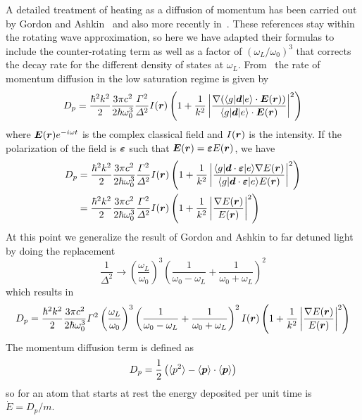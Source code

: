 A detailed treatment of heating as a diffusion of momentum has been carried
out by Gordon and Ashkin~\cite{Gordon1980} and also more recently
in~\cite{Gerbier2010, Pichler2010,Riou2012}.   These references stay within
the rotating wave approximation,  so here we have adapted their formulas to
include the counter-rotating term as well as a factor of
$(\omega_{L}/\omega_{0})^{3}$ that corrects the decay rate for the different
density of states at $\omega_{L}$.  From~\cite{Gordon1980} the rate of
momentum diffusion in the low saturation regime is given by
\begin{equation}
  D_{p} = \frac{\hbar^2 k^{2}}{2}  
   \frac{3\pi c^{2}}{2\hbar\omega_{0}^{3} }  
   \frac{\Gamma^{2}}{\Delta^{2}} I(\bm{r}) 
  \left( 1 + \frac{1}{k^{2}}
    \left| \frac{\nabla( \langle g|\bm{d}|e\rangle\cdot \bm{E}(\bm{r})  )}
                { \langle g|\bm{d}|e\rangle \cdot \bm{E}(\bm{r})} 
    \right|^{2} \right) 
\end{equation}
where $\bm{E}(\bm{r})e^{-i\omega t}$ is the complex classical field and
$I(\bm{r})$ is the intensity.  If the polarization of the field is
$\bm{\varepsilon}$ such that $\bm{E}(\bm{r}) = \bm{\varepsilon} E(\bm{r})$, we
have  
\begin{equation}
\begin{split}
  D_{p} & = 
  \frac{\hbar^2 k^{2}}{2}  
   \frac{3\pi c^{2}}{2\hbar\omega_{0}^{3} }  
   \frac{\Gamma^{2}}{\Delta^{2}} I(\bm{r}) 
  \left( 1 + \frac{1}{k^{2}}
    \left| 
   \frac{ \langle g|\bm{d}\cdot\bm{\varepsilon}|e\rangle\nabla E(\bm{r}) }
        { \langle g|\bm{d}\cdot\bm{\varepsilon}|e\rangle E(\bm{r})} 
    \right|^{2} \right)  \\
&  =  
  \frac{\hbar^2 k^{2}}{2}  
   \frac{3\pi c^{2}}{2\hbar\omega_{0}^{3} }  
   \frac{\Gamma^{2}}{\Delta^{2}} I(\bm{r}) 
  \left( 1 + \frac{1}{k^{2}}
    \left| 
   \frac{ \nabla E(\bm{r}) }
        {  E(\bm{r})} 
    \right|^{2} \right) 
\end{split}
\end{equation}
At this point we generalize the result of Gordon and Ashkin to far detuned light by doing the replacement
\begin{equation}
  \frac{1}{\Delta^{2}} \rightarrow 
  \left( \frac{ \omega_{L} }{ \omega_{0} } \right)^{3}
   \left(  \frac{1}{\omega_{0}-\omega_{L}} 
    + \frac{1}{\omega_{0} + \omega_{L} } \right)^{2}
\end{equation}
which results in 
\begin{equation}
D_{p}  =  
  \frac{\hbar^2 k^{2}}{2}  
   \frac{3\pi c^{2}}{2\hbar\omega_{0}^{3} }  
   \Gamma^{2}
  \left( \frac{ \omega_{L} }{ \omega_{0} } \right)^{3}
   \left(  \frac{1}{\omega_{0}-\omega_{L}} 
    + \frac{1}{\omega_{0} + \omega_{L} } \right)^{2}
   I(\bm{r}) 
  \left( 1 + \frac{1}{k^{2}}
    \left| 
   \frac{ \nabla E(\bm{r}) }
        {  E(\bm{r})} 
    \right|^{2} \right) 
\end{equation}
The momentum diffusion term is defined as 
\begin{equation}
  D_{p} = \frac{1}{2} \left( \langle p^{2} \rangle - 
   \langle \bm{p} \rangle \cdot \langle \bm{p} \rangle \right) 
\end{equation}
so for an atom that starts at rest the energy deposited per unit time is
$\dot{E} =  D_{p}/m$.  

